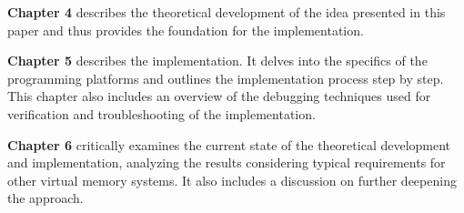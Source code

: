 \textbf{Chapter 4} describes the theoretical development of the idea presented in this paper and thus provides the foundation for the implementation.

\textbf{Chapter 5} describes the implementation. It delves into the specifics of the programming platforms and outlines the implementation process step by step. This chapter also includes an overview of the debugging techniques used for verification and troubleshooting of the implementation.

\textbf{Chapter 6} critically examines the current state of the theoretical development and implementation, analyzing the results considering typical requirements for other virtual memory systems. It also includes a discussion on further deepening the approach.











